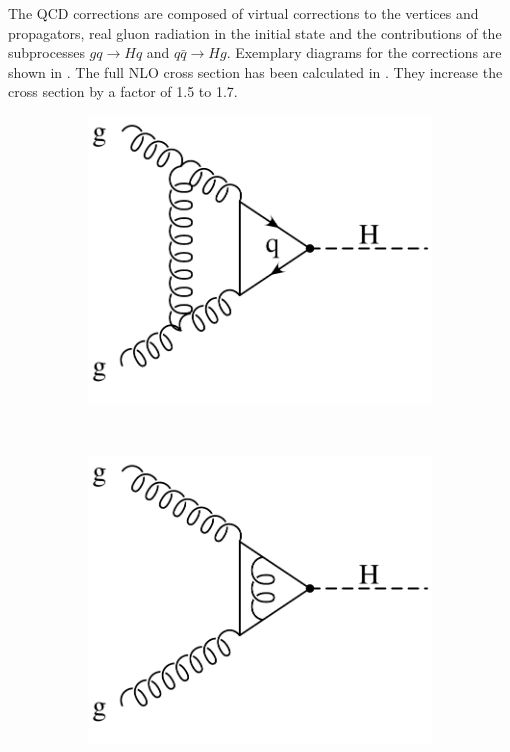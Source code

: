 The QCD corrections are composed of virtual corrections to the vertices and propagators, real gluon radiation in the initial state and the contributions of the subprocesses $gq \rightarrow Hq$ and $q \bar q \rightarrow Hg$.
Exemplary diagrams for the corrections are shown in .
The full NLO cross section has been calculated in \cite{gfusionnlo1,gfusionnlo2,gfusionnlo3}.
They increase the cross section by a factor of \num{1.5} to \num{1.7}.
%
\begin{figure}
\centering
\begin{subfigure}[]{0.3\textwidth}
	\includegraphics[width=\textwidth]{images/gluonfusion_virtual1.pdf}
	\caption{}
\end{subfigure}
~
\begin{subfigure}[]{0.3\textwidth}
	\includegraphics[width=\textwidth]{images/gluonfusion_virtual2.pdf}

\end{subfigure}
\end{figure}
